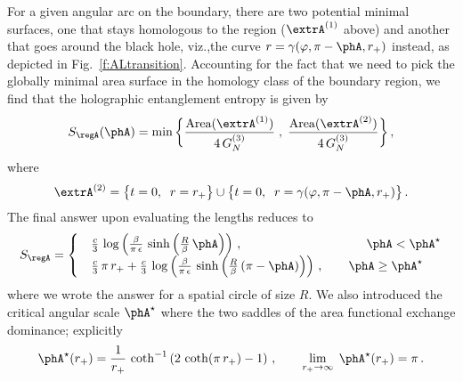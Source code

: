 \documentclass[12pt,openany]{book}
\begin{document}
For a given angular arc on the boundary, there are two potential minimal surfaces, one that stays homologous to the region ($\extrA^{(1)}$ above) and another that goes around the black hole, viz.,the curve $r =\gamma(\varphi, \pi-\phA,r_+)$ instead, as depicted in Fig.~\ref{f:ALtransition}. Accounting for the fact that we need to pick the globally minimal area surface in the homology class of the boundary region, we find that the holographic entanglement entropy is given by
%
\begin{align}
S_\regA(\phA) =\min \bigg\{ \frac{\text{Area}(\extrA^{(1)})}{4\, G_N^{(3)}}\;,\;\frac{\text{Area}(\extrA^{(2)})}{4\, G_N^{(3)}} \bigg\} \,,
\end{align}
%
where
%
\begin{align}
\extrA^{(2)} = \big\{t=0, \;\; r=r_+ \big\} \cup \big\{t=0,\;\; r =\gamma(\varphi, \pi-\phA,r_+) \big\} \,.
\label{}
\end{align}
The final answer upon evaluating the lengths reduces to
%
\begin{equation}
S_\regA =
  \begin{cases}
    &\frac{c}{3}\, \log \left(\frac{\beta}{\pi\, \epsilon} \, \sinh \left(\frac{R}{\beta}\,\phA\right)
    \right) \,,\hspace{3.5cm} \phA < \phA^\star
    \\
    & \frac{c}{3}\,\pi\,r_+ + \frac{c}{3}\, \log \left(\frac{\beta}{\pi\, \epsilon} \, \sinh \left(
    \frac{R}{\beta}\,(\pi - \phA) \right) \right) \,,\qquad \phA \geq \phA^\star
    \end{cases}
\label{eq:salargec}
\end{equation}
%
where we wrote the answer for a spatial circle of size $R$. We also introduced the critical angular scale $\phA^\star$  where the two saddles of the area functional exchange dominance; explicitly
%
\begin{align}
\phA^\star(r_+) = \frac{1}{r_+}\, \coth^{-1} \left(2\, \coth(\pi\, r_+) -1\right)  \,, \qquad \lim_{r_+ \to \infty}\; \phA^\star(r_+) = \pi \,.
\end{align}
%
\end{document}
